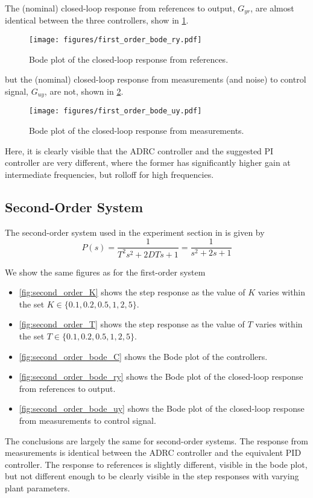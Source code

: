 \documentclass[letterpaper, 10 pt, conference]{ieeeconf}
\begin{document}
The (nominal) closed-loop response from references to output, $G_{yr}$, are almost identical between the three controllers, show in \cref{fig:first_order_bode_ry}.
\begin{figure}[h]
	\centering
	\texttt{[image: figures/first\_order\_bode\_ry.pdf]}
	\caption{Bode plot of the closed-loop response from references.}
	\label{fig:first_order_bode_ry}
\end{figure}

but the (nominal) closed-loop response from measurements (and noise) to control signal, $G_{uy}$, are not, shown in \cref{fig:first_order_bode_uy}.
\begin{figure}[h]
	\centering
	\texttt{[image: figures/first\_order\_bode\_uy.pdf]}
	\caption{Bode plot of the closed-loop response from measurements.}
	\label{fig:first_order_bode_uy}
\end{figure}
Here, it is clearly visible that the ADRC controller and the suggested PI controller are very different, where the former has significantly higher gain at intermediate frequencies, but rolloff for high frequencies.

\subsection{Second-Order System}
The second-order system used in the experiment section in \cite{herbst2013simulative} is given by
$$P(s) = \dfrac{1}{T^2s^2 + 2DTs + 1} = \dfrac{1}{s^2 + 2s + 1}$$

We show the same figures as for the first-order system
\begin{itemize}
	\item \cref{fig:second_order_K} shows the step response as the value of $K$ varies within the set $K \in \{0.1, 0.2, 0.5, 1, 2, 5\}$.
	\item \cref{fig:second_order_T} shows the step response as the value of $T$ varies within the set $T \in \{0.1, 0.2, 0.5, 1, 2, 5\}$.
	\item \cref{fig:second_order_bode_C} shows the Bode plot of the controllers.
	\item \cref{fig:second_order_bode_ry} shows the Bode plot of the closed-loop response from references to output.
	\item \cref{fig:second_order_bode_uy} shows the Bode plot of the closed-loop response from measurements to control signal.
\end{itemize}
The conclusions are largely the same for second-order systems. The response from measurements is identical between the ADRC controller and the equivalent PID controller. The response to references is slightly different, visible in the bode plot, but not different enough to be clearly visible in the step responses with varying plant parameters.
\end{document}
